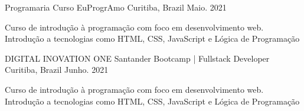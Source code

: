 

\begin{cventries}

  \cventry
    {Programaria} %
    {Curso EuProgrAmo} %
    {Curitiba, Brazil} %
    {Maio. 2021} %
    {
      \begin{cvitems} %
        \item {Curso de introdução à programação com foco em desenvolvimento web. Introdução a tecnologias como HTML, CSS, JavaScript e Lógica de Programação }
      \end{cvitems}
    }

 \cventry
    {DIGITAL INOVATION ONE} %
    {Santander Bootcamp | Fullstack Developer} %
    {Curitiba, Brazil} %
    {Junho. 2021} %
    {
      \begin{cvitems} %
        \item {Curso de introdução à programação com foco em desenvolvimento web. Introdução a tecnologias como HTML, CSS, JavaScript e Lógica de Programação }
      \end{cvitems}
    }

\end{cventries}
